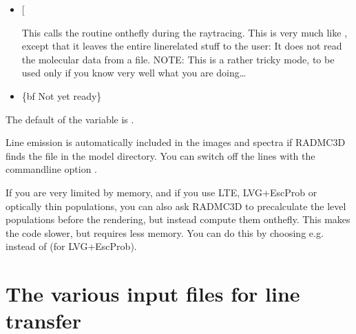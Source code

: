 \documentclass[letterpaper,10pt,english]{sphinxmanual}
\begin{document}
\begin{itemize}
\item {} 
 {[}\sphinxcode{\sphinxupquote{lines\_mode=\sphinxhyphen{}10}}{]}

This calls the routine 
on\sphinxhyphen{}the\sphinxhyphen{}fly during the ray\sphinxhyphen{}tracing. This is very much like
, except that it leaves the
entire line\sphinxhyphen{}related stuff to the user: It does not read the molecular
data from a file. NOTE: This is a rather tricky mode, to be used only
if you know very well what you are doing…

\item {} 
 \{bf Not yet ready\}

\end{itemize}

The default of the  variable is .

 Line emission is automatically included in the images and spectra if
RADMC\sphinxhyphen{}3D finds the file  in the model directory. You can switch off
the lines with the command\sphinxhyphen{}line option .

 If you are very limited by memory, and if you use LTE, LVG+EscProb
or optically thin populations, you can also ask RADMC\sphinxhyphen{}3D to  precalculate
the level populations before the rendering, but instead compute them
on\sphinxhyphen{}the\sphinxhyphen{}fly. This makes the code slower, but requires less memory.  You can do
this by choosing e.g.  instead of  (for
LVG+EscProb).


\section{The various input files for line transfer}
\label{\detokenize{lineradtrans:the-various-input-files-for-line-transfer}}
\end{document}

